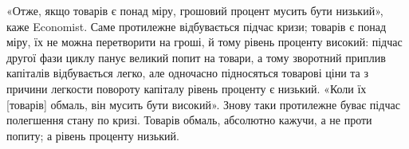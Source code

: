 «Отже, якщо товарів є понад міру, грошовий процент мусить бути низький»,
каже Economist. Саме протилежне відбувається підчас кризи; товарів є понад міру, їх
не можна перетворити на гроші, й тому рівень проценту високий: підчас другої фази
циклу панує великий попит на товари, а тому зворотний приплив капіталів відбувається
легко, але одночасно підносяться товарові ціни та з причини легкости повороту
капіталу рівень проценту є низький. «Коли їх [товарів] обмаль, він мусить
бути високий». Знову таки протилежне буває підчас полегшення стану по кризі. Товарів
обмаль, абсолютно кажучи, а не проти попиту; а рівень проценту низький.

